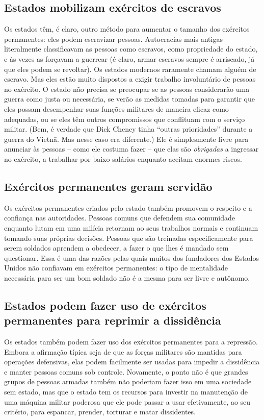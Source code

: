 \subsection*{Estados mobilizam exércitos de escravos}

Os estados têm, é claro, outro método para aumentar o tamanho dos exércitos permanentes: eles podem escravizar pessoas. Autocracias mais antigas literalmente classificavam as pessoas como escravos, como propriedade do estado, e às vezes as forçavam a guerrear (é claro, armar escravos sempre é arriscado, já que eles podem se revoltar). Os estados modernos raramente chamam alguém de escravo. Mas eles estão muito dispostos a exigir trabalho involuntário de pessoas no exército. O estado não precisa se preocupar se as pessoas considerarão uma guerra como justa ou necessária, se verão as medidas tomadas para garantir que eles possam desempenhar suas funções militares de maneira eficaz como adequadas, ou se eles têm outros compromissos que conflituam com o serviço militar. (Bem, é verdade que Dick Cheney tinha ``outras prioridades'' durante a guerra do Vietnã. Mas nesse caso era diferente.) Ele é simplesmente livre para anunciar às pessoas -- como ele costuma fazer -- que elas são \emph{obrigadas} a ingressar no exército, a trabalhar por baixo salários enquanto aceitam enormes riscos.

\subsection*{Exércitos permanentes geram servidão}

Os exércitos permanentes criados pelo estado também promovem o respeito e a confiança nas autoridades. Pessoas comuns que defendem sua comunidade enquanto lutam em uma milícia retornam ao seus trabalhos normais e continuam tomando suas próprias decisões. Pessoas que são treinadas especificamente para serem soldados aprendem a obedecer, a fazer o que lhes é mandado sem questionar. Essa é uma das razões pelas quais muitos dos fundadores dos Estados Unidos não confiavam em exércitos permanentes: o tipo de mentalidade necessária para ser um bom soldado não é a mesma para ser livre e autônomo.

\subsection*{Estados podem fazer uso de exércitos permanentes para reprimir a dissidência}

Os estados também podem fazer uso dos exércitos permanentes para a repressão. Embora a afirmação típica seja de que as forças militares são mantidas para operações defensivas, elas podem facilmente ser usadas para impedir a dissidência e manter pessoas comuns sob controle. Novamente, o ponto não é que grandes grupos de pessoas armadas também não poderiam fazer isso em uma sociedade sem estado, mas que o estado tem os recursos para investir na manutenção de uma máquina militar poderosa que ele pode passar a usar efetivamente, ao seu critério, para espancar, prender, torturar e matar dissidentes.


